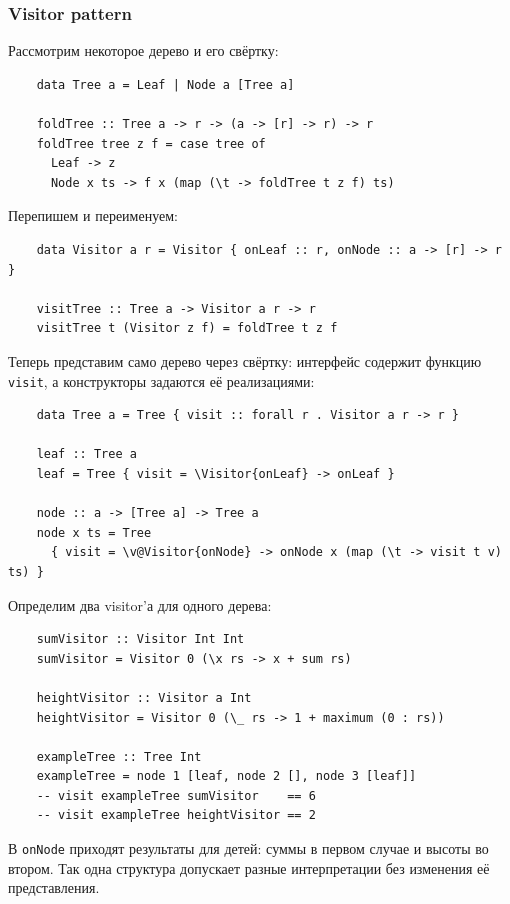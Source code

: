 \subsubsection{Visitor pattern} \label{subsubsec:visitor}

Рассмотрим некоторое дерево и его свёртку:
\begin{verbatim}
    data Tree a = Leaf | Node a [Tree a]

    foldTree :: Tree a -> r -> (a -> [r] -> r) -> r
    foldTree tree z f = case tree of
      Leaf -> z
      Node x ts -> f x (map (\t -> foldTree t z f) ts)
\end{verbatim}

Перепишем и переименуем:
\begin{verbatim}
    data Visitor a r = Visitor { onLeaf :: r, onNode :: a -> [r] -> r }

    visitTree :: Tree a -> Visitor a r -> r
    visitTree t (Visitor z f) = foldTree t z f
\end{verbatim}

Теперь представим само дерево через свёртку: интерфейс содержит функцию \texttt{visit}, а конструкторы задаются её реализациями:
\begin{verbatim}
    data Tree a = Tree { visit :: forall r . Visitor a r -> r }

    leaf :: Tree a
    leaf = Tree { visit = \Visitor{onLeaf} -> onLeaf }

    node :: a -> [Tree a] -> Tree a
    node x ts = Tree
      { visit = \v@Visitor{onNode} -> onNode x (map (\t -> visit t v) ts) }
\end{verbatim}

Определим два visitor'а для одного дерева:
\begin{verbatim}
    sumVisitor :: Visitor Int Int
    sumVisitor = Visitor 0 (\x rs -> x + sum rs)

    heightVisitor :: Visitor a Int
    heightVisitor = Visitor 0 (\_ rs -> 1 + maximum (0 : rs))

    exampleTree :: Tree Int
    exampleTree = node 1 [leaf, node 2 [], node 3 [leaf]]
    -- visit exampleTree sumVisitor    == 6
    -- visit exampleTree heightVisitor == 2
\end{verbatim}
В \texttt{onNode} приходят результаты для детей: суммы в первом случае и высоты во втором.
Так одна структура допускает разные интерпретации без изменения её представления.


